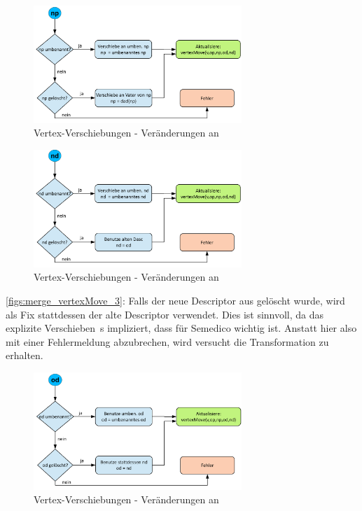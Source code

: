 \begin{figure}
\begin{center}
\includegraphics[width=0.7\textwidth]{figs/merge_vertexMove_2.pdf}
\end{center}
\caption{Vertex-Verschiebungen - Veränderungen an }
\label{figs:merge_vertexMove_2}
\end{figure}

\begin{figure}
\begin{center}
\includegraphics[width=0.7\textwidth]{figs/merge_vertexMove_3.pdf}
\end{center}
\caption{Vertex-Verschiebungen - Veränderungen an }
\label{figs:merge_vertexMove_3}
\end{figure}

\autoref{figs:merge_vertexMove_3}: Falls der neue Descriptor  aus  gelöscht wurde, wird als Fix stattdessen der alte Descriptor  verwendet. Dies ist sinnvoll, da das explizite Verschieben \,s impliziert, dass  für Semedico wichtig ist. Anstatt hier also mit einer Fehlermeldung abzubrechen, wird versucht die Transformation zu erhalten.

\begin{figure}
\begin{center}
\includegraphics[width=0.7\textwidth]{figs/merge_vertexMove_4.pdf}
\end{center}
\caption{Vertex-Verschiebungen - Veränderungen an }
\label{figs:merge_vertexMove_4}
\end{figure}

